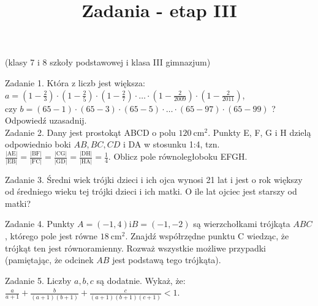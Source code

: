 \documentclass[10pt]{article}
\title{Zadania - etap III }
\author{}
\date{}
\begin{document}
\maketitle
(klasy 7 i 8 szkoły podstawowej i klasa III gimnazjum)

Zadanie 1. Która z liczb jest większa:\\
\(a=\left(1-\frac{2}{3}\right) \cdot\left(1-\frac{2}{5}\right) \cdot\left(1-\frac{2}{7}\right) \cdot \ldots \cdot\left(1-\frac{2}{2009}\right) \cdot\left(1-\frac{2}{2011}\right)\),\\
czy \(b=(65-1) \cdot(65-3) \cdot(65-5) \cdot \ldots \cdot(65-97) \cdot(65-99)\) ? Odpowiedź uzasadnij.\\
Zadanie 2. Dany jest prostokąt ABCD o polu \(120 \mathrm{~cm}^{2}\). Punkty E, F, G i H dzielą odpowiednio boki \(A B, B C, C D\) i DA w stosunku 1:4, tzn. \(\frac{|\mathrm{AE}|}{|\mathrm{EB}|}=\frac{|\mathrm{BF}|}{|\mathrm{FC}|}=\frac{|\mathrm{CG}|}{|\mathrm{GD}|}=\frac{|\mathrm{DH}|}{|\mathrm{HA}|}=\frac{1}{4}\). Oblicz pole równoległoboku EFGH.

Zadanie 3. Średni wiek trójki dzieci i ich ojca wynosi 21 lat i jest o rok większy od średniego wieku tej trójki dzieci i ich matki. O ile lat ojciec jest starszy od matki?

Zadanie 4. Punkty \(A=(-1,4) \mathrm{i} B=(-1,-2)\) są wierzchołkami trójkąta \(A B C\), którego pole jest równe \(18 \mathrm{~cm}^{2}\). Znajdź współrzędne punktu C wiedząc, że trójkąt ten jest równoramienny. Rozważ wszystkie możliwe przypadki (pamiętając, że odcinek \(A B\) jest podstawą tego trójkąta).

Zadanie 5. Liczby \(a, b, c\) są dodatnie. Wykaż, że: \(\frac{a}{a+1}+\frac{b}{(a+1)(b+1)}+\frac{c}{(a+1)(b+1)(c+1)}<1\).
\end{document}
